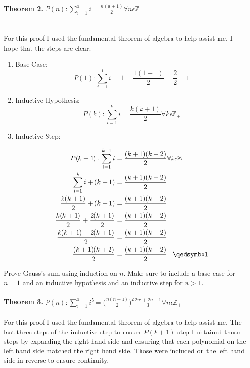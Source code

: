 \documentclass[12pt]{article}
\begin{document}
\noindent \textbf{Theorem 2.}
\begin{math}P(n):\sum\limits_{i = 1}^{n} i = \frac{n(n + 1)}{2} \forall n \epsilon \mathbb{Z}_+  \end{math}\\
\\\\For this proof I used the fundamental theorem of algebra to help assist me. I hope that the steps are clear.\\
\begin{enumerate}
\item Base Case:\\
\[P(1):\sum\limits_{i = 1}^{1} i = 1  = \frac{1(1+1)}{2} = \frac{2}{2} = 1\]
\item Inductive Hypothesis:
\[P(k):\sum\limits_{i = 1}^{k} i = \frac{k(k + 1)}{2} \forall k \epsilon \mathbb{Z}_+\]
\item Inductive Step:

\begin{align*}
P(k+1):\sum\limits_{i = 1}^{k+1} i &= \frac{(k + 1)(k+2)}{2} \forall k \epsilon \mathbb{Z}_+\\
\sum\limits_{i = 1}^{k} i + (k + 1)&= \frac{(k + 1)(k+2)}{2}\\
\frac{k(k+1)}{2} + (k+1)&= \frac{(k + 1)(k+2)}{2}\\
\frac{k(k+1)}{2} + \frac{2(k+1)}{2}&= \frac{(k + 1)(k+2)}{2}\\
\frac{k(k+1)+ 2(k+1)}{2}&= \frac{(k + 1)(k+2)}{2}\\
\frac{(k + 1)(k+2)}{2}&= \frac{(k + 1)(k+2)}{2} \hspace{0.3cm}\qedsymbol
\end{align*}
\end{enumerate}
\noindent Prove Gauss’s sum using induction on \begin{math}n\end{math}. Make sure to include a base case for \begin{math} n = 1\end{math} and an inductive hypothesis and an inductive step for \begin{math}n > 1\end{math}.\\\\
\noindent \textbf{Theorem 3.}
\begin{math}P(n):\sum\limits_{i = 1}^{n} i^5 = \big(\frac{n(n + 1)}{2}\big)^2\frac{2n^2+2n-1}{3} \forall n \epsilon \mathbb{Z}_+  \end{math}
\\\\For this proof I used the fundamental theorem of algebra to help assist me. The last three steps of the inductive step to ensure \begin{math}P(k+1)\end{math} step I obtained those steps by expanding the right hand side and ensuring that each polynomial on the left hand side matched the right hand side. Those were included on the left hand side in reverse to ensure continuity.\\
\end{document}
